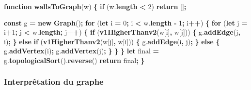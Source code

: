 \documentclass[11pt,french,a4paper,]{article}
\newenvironment{Shaded}{\begin{snugshade}}{\end{snugshade}}
\newcommand{\AttributeTok}[1]{\textcolor[rgb]{0.00,0.36,0.77}{\textbf{#1}}}
\newcommand{\ControlFlowTok}[1]{\textcolor[rgb]{0.68,0.35,0.62}{\textbf{#1}}}
\newcommand{\DecValTok}[1]{\textcolor[rgb]{0.00,0.00,0.81}{#1}}
\newcommand{\KeywordTok}[1]{\textcolor[rgb]{0.68,0.35,0.62}{\textbf{#1}}}
\newcommand{\NormalTok}[1]{#1}
\newcommand{\OperatorTok}[1]{\textcolor[rgb]{0.81,0.36,0.00}{\textbf{#1}}}
\newcommand{\VariableTok}[1]{\textcolor[rgb]{0.90,0.33,0.00}{#1}}
\begin{document}
\begin{Shaded}
\begin{Highlighting}[]
\KeywordTok{function} \AttributeTok{wallsToGraph}\NormalTok{(w) }\OperatorTok{\{}
    \ControlFlowTok{if}\NormalTok{ (}\VariableTok{w}\NormalTok{.}\AttributeTok{length} \OperatorTok{<} \DecValTok{2}\NormalTok{) }\ControlFlowTok{return}\NormalTok{ []}\OperatorTok{;}

    \KeywordTok{const}\NormalTok{ g }\OperatorTok{=} \KeywordTok{new} \AttributeTok{Graph}\NormalTok{()}\OperatorTok{;}
    \ControlFlowTok{for}\NormalTok{ (}\KeywordTok{let}\NormalTok{ i }\OperatorTok{=} \DecValTok{0}\OperatorTok{;}\NormalTok{ i }\OperatorTok{<} \VariableTok{w}\NormalTok{.}\AttributeTok{length} \OperatorTok{-} \DecValTok{1}\OperatorTok{;}\NormalTok{ i}\OperatorTok{++}\NormalTok{) }\OperatorTok{\{}
        \ControlFlowTok{for}\NormalTok{ (}\KeywordTok{let}\NormalTok{ j }\OperatorTok{=}\NormalTok{ i}\OperatorTok{+}\DecValTok{1}\OperatorTok{;}\NormalTok{ j }\OperatorTok{<} \VariableTok{w}\NormalTok{.}\AttributeTok{length}\OperatorTok{;}\NormalTok{ j}\OperatorTok{++}\NormalTok{) }\OperatorTok{\{}
            \ControlFlowTok{if}\NormalTok{ (}\AttributeTok{v1HigherThanv2}\NormalTok{(w[i]}\OperatorTok{,}\NormalTok{ w[j])) }\OperatorTok{\{}
                \VariableTok{g}\NormalTok{.}\AttributeTok{addEdge}\NormalTok{(j}\OperatorTok{,}\NormalTok{ i)}\OperatorTok{;}
            \OperatorTok{\}} \ControlFlowTok{else} \ControlFlowTok{if}\NormalTok{ (}\AttributeTok{v1HigherThanv2}\NormalTok{(w[j]}\OperatorTok{,}\NormalTok{ w[i])) }\OperatorTok{\{}
                \VariableTok{g}\NormalTok{.}\AttributeTok{addEdge}\NormalTok{(i}\OperatorTok{,}\NormalTok{ j)}\OperatorTok{;}
            \OperatorTok{\}} \ControlFlowTok{else} \OperatorTok{\{}
                \VariableTok{g}\NormalTok{.}\AttributeTok{addVertex}\NormalTok{(i)}\OperatorTok{;}
                \VariableTok{g}\NormalTok{.}\AttributeTok{addVertex}\NormalTok{(j)}\OperatorTok{;}
            \OperatorTok{\}}
        \OperatorTok{\}}
    \OperatorTok{\}}
    \KeywordTok{let}\NormalTok{ final }\OperatorTok{=} \VariableTok{g}\NormalTok{.}\AttributeTok{topologicalSort}\NormalTok{().}\AttributeTok{reverse}\NormalTok{()}
    \ControlFlowTok{return}\NormalTok{ final}\OperatorTok{;}
\OperatorTok{\}}
\end{Highlighting}
\end{Shaded}

\hypertarget{interpruxeatation-du-graphe}{%
\subsubsection{Interprêtation du
graphe}\label{interpruxeatation-du-graphe}}
\end{document}

